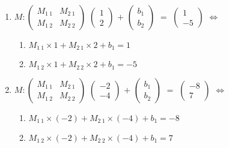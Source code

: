 		\begin{enumerate}
			\item $M : \left( \begin{array}{cc}
			M_{1 \ 1} & M_{2 \ 1} \\
			M_{1 \ 2} & M_{2 \ 2}
			\end{array} \right)$
			$\left( \begin{array}{c}
			1 \\
			2
			\end{array} \right)$ $+$
			$\left( \begin{array}{c}
			b_1 \\
			b_2
			\end{array} \right)$ $=$
			$\left( \begin{array}{c}
			1 \\
			-5 
			\end{array} \right)$ $\Longleftrightarrow$
			\begin{enumerate}
				\item $M_{1 \ 1} \times 1 + M_{2 \ 1} \times 2 + b_1 = 1$
				\item $M_{1 \ 2} \times 1 + M_{2 \ 2} \times 2 + b_1 = -5$
			\end{enumerate}
			
			\item $M : \left( \begin{array}{cc}
			M_{1 \ 1} & M_{2 \ 1} \\
			M_{1 \ 2} & M_{2 \ 2}
			\end{array} \right)$
			$\left( \begin{array}{c}
			-2 \\
			-4
			\end{array} \right)$ $+$
			$\left( \begin{array}{c}
			b_1 \\
			b_2
			\end{array} \right)$ $=$
			$\left( \begin{array}{c}
			-8 \\
			7 
			\end{array} \right)$ $\Longleftrightarrow$
			\begin{enumerate}
				\item $M_{1 \ 1} \times (-2) + M_{2 \ 1} \times (-4) + b_1 = -8$
				\item $M_{1 \ 2} \times (-2) + M_{2 \ 2} \times (-4) + b_1 = 7$
			\end{enumerate}
			

\end{enumerate}
